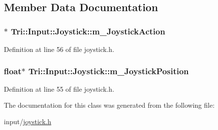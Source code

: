 \subsection{Member Data Documentation}
\hypertarget{class_tri_1_1_input_1_1_joystick_a01085701baf18c41dc10f9cf98d84562}{}
\subsubsection[{m\+\_\+\+Joystick\+Action}]{$\ast$ Tri\+::\+Input\+::\+Joystick\+::m\+\_\+\+Joystick\+Action\hspace{0.3cm}{\ttfamily [protected]}}\label{class_tri_1_1_input_1_1_joystick_a01085701baf18c41dc10f9cf98d84562}


Definition at line 56 of file joystick.\+h.

\hypertarget{class_tri_1_1_input_1_1_joystick_a572652754a153f3a63653768d1861c69}{}
\subsubsection[{m\+\_\+\+Joystick\+Position}]{\setlength{\rightskip}{0pt plus 5cm}float$\ast$ Tri\+::\+Input\+::\+Joystick\+::m\+\_\+\+Joystick\+Position\hspace{0.3cm}{\ttfamily [protected]}}\label{class_tri_1_1_input_1_1_joystick_a572652754a153f3a63653768d1861c69}


Definition at line 55 of file joystick.\+h.



The documentation for this class was generated from the following file\+:\begin{DoxyCompactItemize}
\item 
input/\hyperlink{joystick_8h}{joystick.\+h}\end{DoxyCompactItemize}
